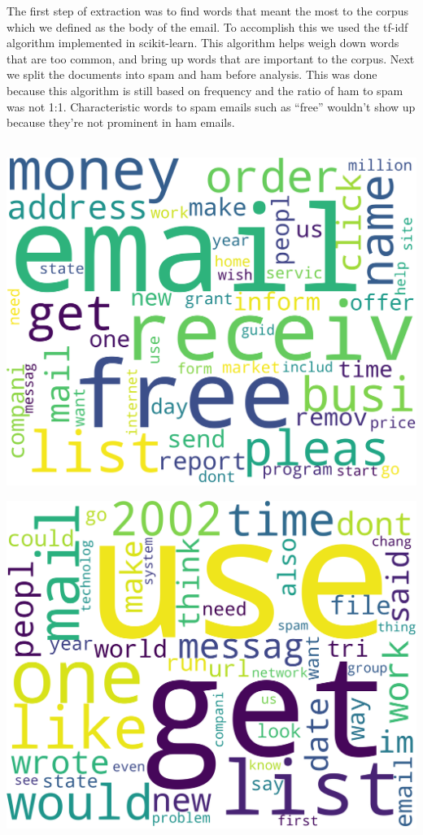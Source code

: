 \documentclass[12pt]{article}
\begin{document}
\begin{multicols}{2}
            The first step of extraction was
            to find words that meant the most to the corpus which we defined as
            the body of the email. To accomplish this
            we used the tf-idf algorithm implemented in scikit-learn. This algorithm helps
            weigh down words that are too common, and bring up words that are important
            to the corpus. Next we split the documents into spam and ham before analysis.
            This was done because this algorithm is still based on frequency and the
            ratio of ham to spam was not 1:1. Characteristic words to spam emails such
            as ``free'' wouldn't show up because they're not prominent in ham emails.\\\\
            \noindent\begin{minipage}{0.48\columnwidth}
                \includegraphics[width=\textwidth]{figures/spam_wc}
                \label{fig:spam_wc}
            \end{minipage}
            \begin{minipage}{0.48\columnwidth}
                \includegraphics[width=\textwidth]{figures/ham_wc}

\end{minipage}
\end{multicols}
\end{document}
